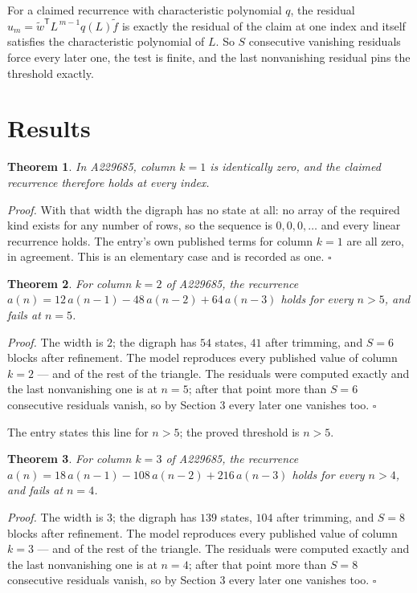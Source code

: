 \documentclass[11pt]{article}
\newtheorem{theorem}{Theorem}
\theoremstyle{definition}
\begin{document}
For a claimed recurrence with characteristic polynomial $q$, the residual $u_m = \tilde w^{\mathsf T}L^{\,m-1}q(L)\tilde f$ is exactly the residual of the claim at one index and itself satisfies the characteristic polynomial of $L$. So $S$ consecutive vanishing residuals force every later one, the test is finite, and the last nonvanishing residual pins the threshold exactly.

\section{Results}

\begin{theorem} In A229685, column $k = 1$ is identically zero, and the claimed recurrence therefore holds at every index.\end{theorem}

{\itshape Proof.} With that width the digraph has no state at all: no array of the required kind exists for any number of rows, so the sequence is $0,0,0,\dots$ and every linear recurrence holds. The entry's own published terms for column $k = 1$ are all zero, in agreement. This is an elementary case and is recorded as one. $\square$

\begin{theorem} For column $k = 2$ of A229685, the recurrence $a(n) = 12\,a(n-1) - 48\,a(n-2) + 64\,a(n-3)$ holds for every $n > 5$, and fails at $n = 5$.\end{theorem}

{\itshape Proof.} The width is $2$; the digraph has $54$ states, $41$ after trimming, and $S = 6$ blocks after refinement. The model reproduces every published value of column $k = 2$ --- and of the rest of the triangle. The residuals were computed exactly and the last nonvanishing one is at $n = 5$; after that point more than $S = 6$ consecutive residuals vanish, so by Section 3 every later one vanishes too. $\square$

The entry states this line for $n > 5$; the proved threshold is $n > 5$.

\begin{theorem} For column $k = 3$ of A229685, the recurrence $a(n) = 18\,a(n-1) - 108\,a(n-2) + 216\,a(n-3)$ holds for every $n > 4$, and fails at $n = 4$.\end{theorem}

{\itshape Proof.} The width is $3$; the digraph has $139$ states, $104$ after trimming, and $S = 8$ blocks after refinement. The model reproduces every published value of column $k = 3$ --- and of the rest of the triangle. The residuals were computed exactly and the last nonvanishing one is at $n = 4$; after that point more than $S = 8$ consecutive residuals vanish, so by Section 3 every later one vanishes too. $\square$
\end{document}
